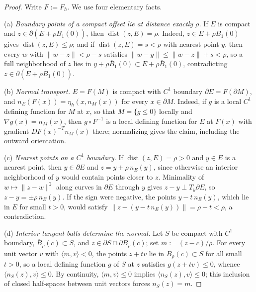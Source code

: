 \documentclass[pdflatex,sn-mathphys-num]{sn-jnl}
\numberwithin{equation}{section}
\theoremstyle{thmstyleone}%
\theoremstyle{definition}
\theoremstyle{remark}
\begin{document}
\begin{proof}
Write $F:=F_h$. We use four elementary facts.

(a) \emph{Boundary points of a compact offset lie at distance exactly $\rho$.}
If $E$ is compact and $z\in\partial(E+\rho\overline B_1(0))$, then $\operatorname{dist}(z,E)=\rho$. Indeed, $z\in E+\rho\overline B_1(0)$ gives
$\operatorname{dist}(z,E)\leq\rho$; and if $\operatorname{dist}(z,E)=s<\rho$ with nearest point $y$, then
every $w$ with $\|w-z\|<\rho-s$ satisfies $\|w-y\|\leq\|w-z\|+s<\rho$, so a full neighborhood of $z$ lies in
$y+\rho\overline B_1(0)\subset E+\rho\overline B_1(0)$, contradicting $z\in\partial(E+\rho\overline B_1(0))$.

(b) \emph{Normal transport.} $E=F(M)$ is compact with $C^1$ boundary $\partial E=F(\partial M)$, and
$n_E(F(x))=\eta_h(x,n_M(x))$ for every $x\in\partial M$. Indeed, if $g$ is a local $C^1$ defining function for $M$ at $x$, so that $M=\{g\leq0\}$ locally and $\nabla g(x)=n_M(x)$, then $g\circ F^{-1}$ is a local defining function for $E$ at $F(x)$ with gradient $DF(x)^{-T}n_M(x)$ there; normalizing gives the claim, including the outward orientation.

(c) \emph{Nearest points on a $C^1$ boundary.} 
If $\operatorname{dist}(z,E)=\rho>0$ and $y\in E$ is a nearest point, then $y\in\partial E$ and $z=y+\rho\,n_E(y)$, since otherwise an interior neighborhood of $y$ would contain points closer to $z$. Minimality of $w\mapsto\|z-w\|^2$ along curves in $\partial E$ through $y$ gives $z-y\perp T_y\partial E$, so $z-y=\pm\rho\,n_E(y)$. If the sign were negative, the points $y-t\,n_E(y)$, which lie in $E$ for small $t>0$, would satisfy $\|z-(y-t\,n_E(y))\|=\rho-t<\rho$, a contradiction.

(d) \emph{Interior tangent balls determine the normal.} Let $S$ be compact with $C^1$ boundary,
$\overline B_\rho(c)\subset S$, and $z\in\partial S\cap\partial B_\rho(c)$; set $m:=(z-c)/\rho$. For every unit vector $v$ with $\langle m,v\rangle<0$, the points $z+tv$ lie in $B_\rho(c)\subset S$ for all small $t>0$, so a local defining function $g$ of $S$ at $z$ satisfies $g(z+tv)\leq0$, whence $\langle n_S(z),v\rangle\leq0$. By continuity, $\langle m,v\rangle\leq0$ implies $\langle n_S(z),v\rangle\leq0$; this inclusion of closed half-spaces between unit vectors forces $n_S(z)=m$.


\end{proof}
\end{document}

